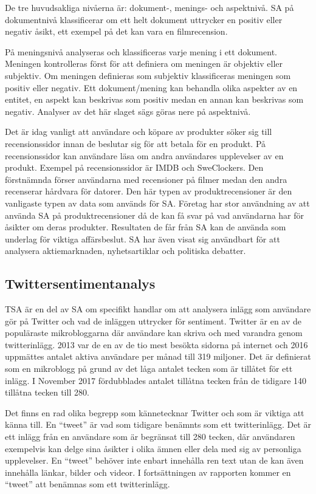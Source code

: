 \documentclass{kaumasters} %
\begin{document}
De tre huvudsakliga nivåerna är: dokument-, menings- och aspektnivå. SA på dokumentnivå klassificerar om ett helt dokument uttrycker en positiv eller negativ åsikt, ett exempel på det kan vara en filmrecension. 

På meningsnivå analyseras och klassificeras varje mening i ett dokument. Meningen kontrolleras först för att definiera om meningen är objektiv eller subjektiv. Om meningen definieras som subjektiv klassificeras meningen som positiv eller negativ. 
Ett dokument/mening kan behandla olika aspekter av en entitet, en aspekt kan beskrivas som positiv medan en annan kan beskrivas som negativ. Analyser av det här slaget sägs göras nere på aspektnivå.

Det är idag vanligt att användare och köpare av produkter söker sig till recensionssidor innan de beslutar sig för att betala för en produkt. På recensionssidor kan användare läsa om andra användares upplevelser av en produkt. Exempel på recensionssidor är IMDB och SweClockers. Den förstnämnda förser användarna med recensioner på filmer medan den andra recenserar hårdvara för datorer. Den här typen av produktrecensioner är den vanligaste typen av data som används för SA. Företag har stor användning av att använda SA på produktrecensioner då de kan få svar på vad användarna har för åsikter om deras produkter. Resultaten de får från SA kan de använda som underlag för viktiga affärsbeslut. SA har även visat sig användbart för att analysera aktiemarknaden, nyhetsartiklar och politiska debatter\cite{SAsurvey}.

\subsection{Twittersentimentanalys}
TSA är en del av SA om specifikt handlar om att analysera inlägg som användare gör på Twitter och vad de inläggen uttrycker för sentiment. Twitter är en av de populäraste mikrobloggarna där användare kan skriva och  med varandra genom twitterinlägg. 2013  var de en av de tio mest besökta sidorna på internet och 2016 uppmättes antalet aktiva användare per månad till 319 miljoner. Det är definierat som en mikroblogg på grund av det låga antalet tecken som är tillåtet för ett inlägg. I November 2017 fördubblades antalet tillåtna tecken från de tidigare 140 tillåtna tecken till 280\cite{wiki:008}. 

Det finns en rad olika begrepp som kännetecknar Twitter och som är viktiga att känna till. En “tweet” är vad som tidigare benämnts som ett twitterinlägg. Det är ett inlägg från en användare som är begränsat till 280 tecken, där användaren exempelvis kan delge sina åsikter i olika ämnen eller dela med sig av personliga upplevelser. En “tweet” behöver inte enbart innehålla ren text utan de kan även innehålla länkar, bilder och videor. I fortsättningen av rapporten kommer en “tweet” att benämnas som ett twitterinlägg.
\end{document}
